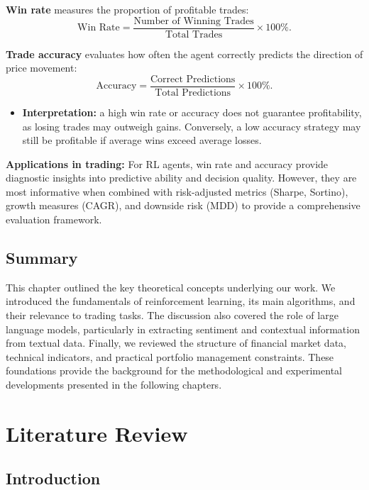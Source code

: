 \documentclass[12pt,a4paper]{report}
\begin{document}
\textbf{Win rate} measures the proportion of profitable trades:
\[
\text{Win Rate} = \frac{\text{Number of Winning Trades}}{\text{Total Trades}} \times 100\%.
\]

\textbf{Trade accuracy} evaluates how often the agent correctly predicts the direction of price movement:
\[
\text{Accuracy} = \frac{\text{Correct Predictions}}{\text{Total Predictions}} \times 100\%.
\]

\begin{itemize}
    \item \textbf{Interpretation:} a high win rate or accuracy does not guarantee profitability, as losing trades may outweigh gains. Conversely, a low accuracy strategy may still be profitable if average wins exceed average losses.
\end{itemize}

\bigskip
\textbf{Applications in trading:}  
For RL agents, win rate and accuracy provide diagnostic insights into predictive ability and decision quality. However, they are most informative when combined with risk-adjusted metrics (Sharpe, Sortino), growth measures (CAGR), and downside risk (MDD) to provide a comprehensive evaluation framework.

\section{Summary}

This chapter outlined the key theoretical concepts underlying our work. We introduced the fundamentals of reinforcement learning, its main algorithms, and their relevance to trading tasks. The discussion also covered the role of large language models, particularly in extracting sentiment and contextual information from textual data. Finally, we reviewed the structure of financial market data, technical indicators, and practical portfolio management constraints. These foundations provide the background for the methodological and experimental developments presented in the following chapters.



\chapter{Literature Review}

\section{Introduction}
\end{document}
